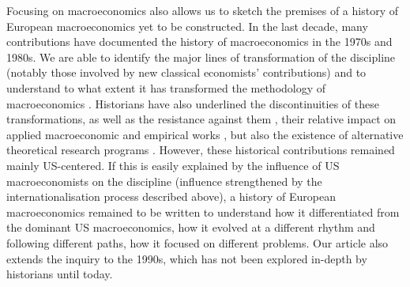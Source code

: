 \documentclass[]{elsarticle} %
\begin{document}
Focusing on macroeconomics also allows us to sketch the premises of a
history of European macroeconomics yet to be constructed. In the last
decade, many contributions have documented the history of macroeconomics
in the 1970s and 1980s. We are able to identify the major lines of
transformation of the discipline (notably those involved by new
classical economists' contributions) and to understand to what extent it
has transformed the methodology of macroeconomics
\citep{duartelima2012a, devroey2016}. Historians have also underlined
the discontinuities of these transformations, as well as the resistance
against them \citep{goutsmedtetal2019, goutsmedt2021b, renault2020a},
their relative impact on applied macroeconomic and empirical works
\citep{boumans2019, qin2013a, renault2022}, but also the existence of
alternative theoretical research programs
\citep{backhouseboianovski2013, cherrier2018c, hoover2012}. However,
these historical contributions remained mainly US-centered. If this is
easily explained by the influence of US macroeconomists on the
discipline (influence strengthened by the internationalisation process
described above), a history of European macroeconomics remained to be
written to understand how it differentiated from the dominant US
macroeconomics, how it evolved at a different rhythm and following
different paths, how it focused on different problems. Our article also
extends the inquiry to the 1990s, which has not been explored in-depth
by historians until today.
\end{document}
